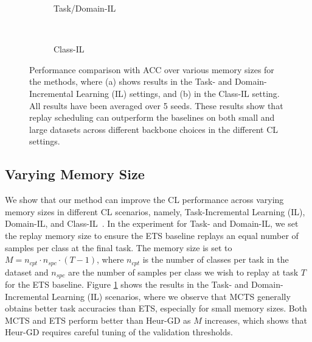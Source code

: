 \begin{figure}[t]
	\centering
	\setlength{\figwidth}{0.35\textwidth}
	\setlength{\figheight}{.16\textheight}
	\begin{subfigure}[b]{0.9\textwidth}
		\centering
		
		\vspace{-1mm}
		\caption{Task/Domain-IL}
		\label{fig:acc_over_memory_size_task_il}
	\end{subfigure} \\
	\begin{subfigure}[b]{0.9\textwidth}
		\centering
		
		\vspace{-1mm}
		\caption{Class-IL}
		\label{fig:acc_over_memory_size_class_il}
	\end{subfigure}
	\vspace{-1mm}
	\caption{Performance comparison with ACC over various memory sizes for the methods, where (a) shows results in the Task- and Domain-Incremental Learning (IL) settings, and (b) in the Class-IL setting. All results have been averaged over 5 seeds. These results show that replay scheduling can outperform the baselines on both small and large datasets across different backbone choices in the different CL settings. 
	}
	\label{fig:acc_over_replay_memory_size}
\end{figure}

%
\subsection{Varying Memory Size}
\label{paperC:sec:results_with_varying_replay_memory_size}

We show that our method can improve the CL performance across varying memory sizes in different CL scenarios, namely, Task-Incremental Learning (IL), Domain-IL, and Class-IL~\cite{van2019three}. In the experiment for Task- and Domain-IL, we set the replay memory size to ensure the ETS baseline replays an equal number of samples per class at the final task. The memory size is set to $M = n_{cpt} \cdot n_{spc} \cdot (T-1)$, where $n_{cpt}$ is the number of classes per task in the dataset and $n_{spc}$ are the number of samples per class we wish to replay at task $T$ for the ETS baseline. Figure \ref{fig:acc_over_memory_size_task_il} shows the results in the Task- and Domain-Incremental Learning (IL) scenarios, where we observe that MCTS generally obtains better task accuracies than ETS, especially for small memory sizes. Both MCTS and ETS perform better than Heur-GD as $M$ increases, which shows that Heur-GD requires careful tuning of the validation thresholds. 

